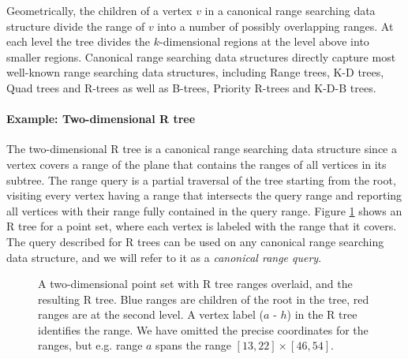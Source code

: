 Geometrically, the children of a vertex $v$ in a canonical range searching data structure divide the range of $v$ into a number of possibly overlapping ranges. At each level the tree divides the $k$-dimensional regions at the level above into smaller regions. Canonical range searching data structures directly capture most well-known range searching data structures, including Range trees, K-D trees, Quad trees and R-trees as well as B-trees, Priority R-trees and K-D-B trees.


\paragraph{Example: Two-dimensional R tree}
The two-dimensional R tree is a canonical range searching data structure since a vertex covers a range of the plane that contains the ranges of all vertices in its subtree. The range query is a partial traversal of the tree starting from the root, visiting every vertex having a range that intersects the query range and reporting all vertices with their range fully contained in the query range. Figure \ref{fig:r-rep} shows an R tree for a point set, where each vertex is labeled with the range that it covers. The query described for R trees can be used on any canonical range searching data structure, and we will refer to it as a \emph{canonical range query}.

\begin{figure}[tb]
	\begin{center}
	\quad\quad\quad\quad{}
	\caption{A two-dimensional point set with R tree ranges overlaid, and the resulting R tree. Blue ranges are children of the root in the tree, red ranges are at the second level. A vertex label ($a$ - $h$) in the R tree identifies the range. We have omitted the precise coordinates for the ranges, but e.g. range $a$ spans the range $[13, 22] \times [46, 54]$. \label{fig:r-rep}}
	\end{center}
\end{figure} 

